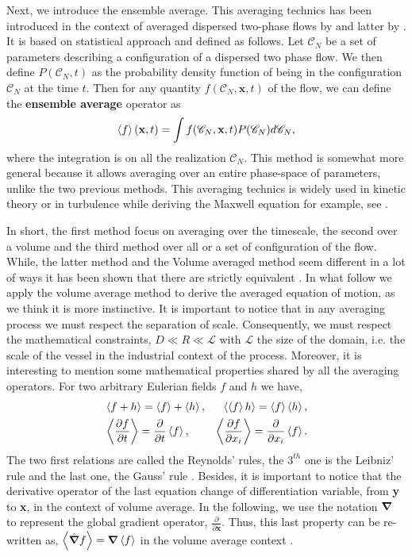 Next, we introduce the ensemble average. 
This averaging technics has been introduced in the context of averaged dispersed 
two-phase flows by \citet{batchelor1972sedimentation,hinch1977averaged} and latter by \citet{zhang1994averaged}.
It is based on statistical approach and defined as follows. 
Let $\mathscr{C}_N$ be a set of parameters describing a configuration of a dispersed two phase flow. 
We then define $P(\mathscr{C}_N,t)$ as the probability density function of being in the configuration $\mathscr{C}_N$ at the time $t$. 
Then for any quantity $f(\mathscr{C}_N,\textbf{x},t)$ of the flow, we can define the \textbf{ensemble average} operator as
\begin{equation}
    \label{eq:enselblea}
    \left<f\right>(\textbf{x},t) 
    = \int f(\mathscr{C}_N,\textbf{x},t) P(\mathscr{C}_N)d\mathscr{C}_N,
\end{equation}
where the integration is on all the realization $\mathscr{C}_N$. 
This method is somewhat more general because it allows averaging over an entire 
phase-space of parameters, unlike the two previous methods. 
This averaging technics is widely used in kinetic theory or in turbulence while deriving the Maxwell equation  for example, see \citet[Chapter 7]{rao2008introduction}.  

In short, the first method focus on averaging over the timescale, the second over a volume and the third method over all or a set of configuration of the flow.
While, the latter method and the Volume averaged method seem different in a lot of ways it has been shown that there are strictly equivalent \citet{jackson1997locally,zhang1994ensemble}.
In what follow we apply the volume average method to derive the averaged equation of motion, as we think it is more instinctive.
It is important to notice that in any averaging process we must respect the separation of 
scale. 
Consequently, we must respect the mathematical constraints, $D\ll R\ll \mathcal{L}$ with $\mathcal{L}$ the size of the domain, i.e. the scale of the vessel in the industrial context of the process. 
Moreover, it is interesting to mention some mathematical properties shared by all the averaging operators. 
For two arbitrary Eulerian fields $f$ and $h$ we have,
\begin{align}
    &\left<f+h\right> = \left<f\right>+\left<h\right>, 
    &\left<\left<f\right>h\right> = \left<f\right>\left<h\right>, \nonumber \\
    &\left<\frac{\partial f}{\partial t}\right> 
    = \frac{\partial}{\partial t}\left<f\right>, 
    &\left<\frac{\partial f}{\partial x_i}\right>
    = \frac{\partial}{\partial x_i}\left<f\right>. 
    \label{eq:avg_properties}
\end{align}
The two first relations are called the Reynolds' rules, the $3^{th}$ one is the Leibniz' 
rule and the last one, the Gauss' rule \citep{drew1983mathematical}.
Besides, it is important to notice that the derivative operator of the last equation change of differentiation variable, from \textbf{y} to \textbf{x}, in the context of volume average.
In the following, we use the notation $\bm{\nabla}$ to represent the global gradient operator, $\frac{\partial}{\partial \textbf{x}}$.
Thus, this last property can be re-written as, $\left<\hat{\bm{\nabla}} f\right>= \bm{\nabla} \left<f\right>$ in the volume average context \citep{jackson1997locally}.


